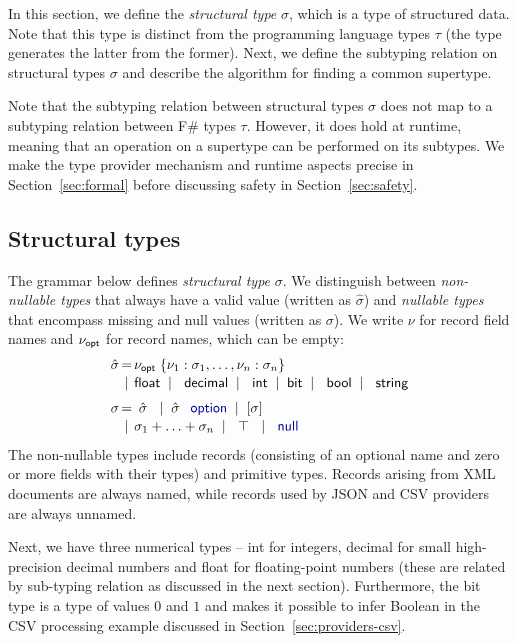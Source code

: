 \documentclass[preprint]{sigplanconf}
\newcommand{\kvd}[1]{\textnormal{\textcolor{kvdclr}{\sffamily #1}}}
\newcommand{\ident}[1]{\textnormal{\sffamily #1}}
\newcommand{\lsep}[0]{\;\; | \;\;}
\newcommand{\narrow}[1]{\hspace{-0.85em} #1 \hspace{-0.85em}}
\begin{document}
In this section, we define the \emph{structural type} $\sigma$, which is a type of structured data.
Note that this type is distinct from the programming language types $\tau$ (the type generates the
latter from the former). Next, we define the subtyping relation on structural types $\sigma$ and 
describe the algorithm for finding a common supertype. 

Note that the subtyping relation between structural types $\sigma$ does not map to a subtyping 
relation between F\#  types $\tau$. However, it does hold at runtime, meaning that an operation on 
a supertype can be performed on its subtypes. We make the type provider mechanism and runtime aspects 
precise in Section~\ref{sec:formal} before discussing safety in Section~\ref{sec:safety}.

\subsection{Structural types}
\label{sec:inference-types}

The grammar below defines \emph{structural type} $\sigma$. We distinguish between \emph{non-nullable types}
that always have a valid value (written as $\hat{\sigma}$) and \emph{nullable types} that encompass missing 
and \kvd{null} values (written as $\sigma$). We write $\nu$ for record field names and $\nu_{\ident{opt}}$
for record names, which can be empty:
%
\begin{equation*}
\begin{array}{rcl}
 \hat{\sigma} &\narrow{=}& \nu_{\ident{opt}}\; \{ \nu_1 : \sigma_1, \ldots, \nu_n : \sigma_n \} \\[0.1em]
                &\narrow{|}& \ident{float} \lsep \ident{decimal} \lsep \ident{int} \lsep \ident{bit} \lsep \ident{bool} \lsep \ident{string} 
 \\[0.6em] 
       \sigma &\narrow{=}& ~\hat{\sigma}~ \lsep \hat{\sigma}\;\,\kvd{option} \lsep [\sigma] \\[0.1em]
              &\narrow{|}& \sigma_1 + \ldots + \sigma_n \lsep ~\top~ \lsep \kvd{null}
\end{array}
\end{equation*}
%
The non-nullable types include records (consisting of an optional name and zero or more fields with
their types) and primitive types. Records arising from XML documents are always named, while records
used by JSON and CSV providers are always unnamed. 

Next, we have three numerical types -- \ident{int} for integers, \ident{decimal} for small high-precision 
decimal numbers and \ident{float} for floating-point numbers (these are related by sub-typing relation as
discussed in the next section). Furthermore, the \ident{bit} type is a type of values $0$ and $1$ and 
makes it possible to infer Boolean in the CSV processing example discussed in Section~\ref{sec:providers-csv}.
\end{document}
